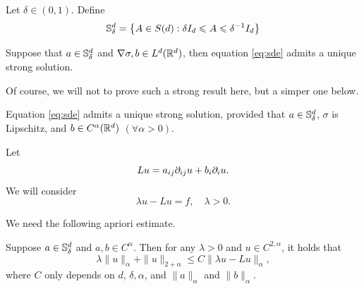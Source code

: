 Let \(\delta\in (0,1)\). Define 
\[
    {\mathbb S}_\delta^d=\left\{ A\in S(d): \delta I_{d} \leqslant A\leqslant \delta^{-1}I_{d} \right\}
\]
\begin{theorem}
    Suppose that $a\in {\mathbb S}_\delta^d$  and $\nabla \sigma, b\in L^d({\mathbb R}^d)$, then equation \eqref{eq:sde} admits a unique strong solution. 
\end{theorem}
    
	
Of course, we will not to prove such a strong result here, but a simper one below. 
\begin{theorem}\label{thm:Zvonkin}
    Equation \eqref{eq:sde} admits a unique strong solution, provided that $a\in {\mathbb S}_\delta^d$, $\sigma$ is Lipschitz, and $b\in C^\alpha({\mathbb R}^d)$ $(\forall \alpha>0)$. 
\end{theorem}
	
Let 
\[
    Lu= a_{ij} \partial_{ij} u+b_i\partial_i u. 
\] 
We will consider
\begin{equation}\label{eq:resolvent1}
    \lambda u - L u =f, \quad \lambda>0. 
\end{equation}


We need the following apriori estimate. 
\begin{lemma}\label{lem:Schauder}
    Suppose $a\in {\mathbb S}_\delta^d$ and $a, b\in C^\alpha$. Then for any \(\lambda>0\) and $u\in C^{2,\alpha}$, it holds that \begin{equation}\label{eq:schauder0}
        \lambda \|u\|_{\alpha} + \|u\|_{2+\alpha} \leq C \|\lambda u-Lu\|_{\alpha}, 
    \end{equation}
    where $C$ only depends on $d$, $\delta, \alpha$, and $\|a\|_\alpha$ and $\|b\|_{\alpha}$. 
\end{lemma}


